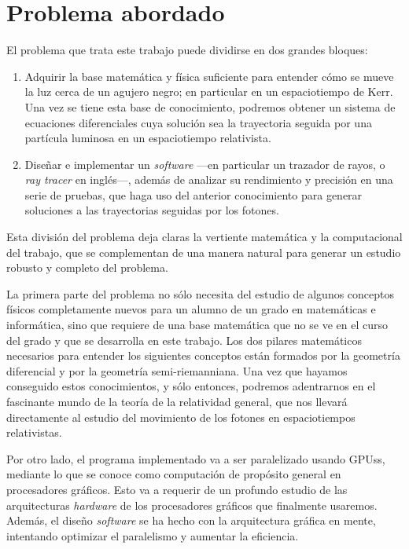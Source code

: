 \section*{Problema abordado}

El problema que trata este trabajo puede dividirse en dos grandes bloques:
\begin{enumerate}
	\item Adquirir la base matemática y física suficiente para entender cómo se mueve la luz cerca de un agujero negro; en particular en un espaciotiempo de Kerr. Una vez se tiene esta base de conocimiento, podremos obtener un sistema de ecuaciones diferenciales cuya solución sea la trayectoria seguida por una partícula luminosa en un espaciotiempo relativista.
	\item Diseñar e implementar un \emph{software} ---en particular un trazador de rayos, o \emph{ray tracer} en inglés---, además de analizar su rendimiento y precisión en una serie de pruebas, que haga uso del anterior conocimiento para generar soluciones a las trayectorias seguidas por los fotones. 
\end{enumerate}

Esta división del problema deja claras la vertiente matemática y la computacional del trabajo, que se complementan de una manera natural para generar un estudio robusto y completo del problema.

La primera parte del problema no sólo necesita del estudio de algunos conceptos físicos completamente nuevos para un alumno de un grado en matemáticas e informática, sino que requiere de una base matemática que no se ve en el curso del grado y que se desarrolla en este trabajo. Los dos pilares matemáticos necesarios para entender los siguientes conceptos están formados por la geometría diferencial y por la geometría semi-riemanniana. Una vez que hayamos conseguido estos conocimientos, y sólo entonces, podremos adentrarnos en el fascinante mundo de la teoría de la relatividad general, que nos llevará directamente al estudio del movimiento de los fotones en espaciotiempos relativistas.

Por otro lado, el programa implementado va a ser paralelizado usando \acp{GPU}s, mediante lo que se conoce como computación de propósito general en procesadores gráficos. Esto va a requerir de un profundo estudio de las arquitecturas \emph{hardware} de los procesadores gráficos que finalmente usaremos. Además, el diseño \emph{software} se ha hecho con la arquitectura gráfica en mente, intentando optimizar el paralelismo y aumentar la eficiencia.


